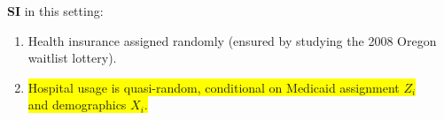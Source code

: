 \documentclass[dvipsnames,handout]{beamer} %
\renewcommand{\vec}[1]{\boldsymbol{\mathit{#1}}}                           %
\begin{document}
\begin{frame}[noframenumbering]
\begin{figure}[h!]
\begin{subfigure}[c]{0.55\textwidth}
        \end{subfigure}
    \end{figure}
    \textbf{SI} in this setting:
    \begin{enumerate}
        \item Health insurance assigned randomly (ensured by studying the 2008 Oregon waitlist lottery).
        \item \colorbox{yellow}{Hospital usage is quasi-random, conditional on Medicaid assignment $Z_i$} \\
        \colorbox{yellow}{and demographics $\vec X_i$.}

    \end{enumerate}
\end{frame}
\end{document}

